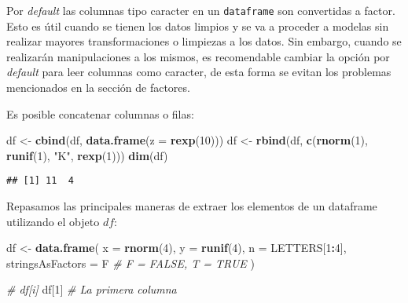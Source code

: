 \documentclass[]{article}
\newenvironment{Shaded}{\begin{snugshade}}{\end{snugshade}}
\newcommand{\KeywordTok}[1]{\textcolor[rgb]{0.13,0.29,0.53}{\textbf{#1}}}
\newcommand{\DataTypeTok}[1]{\textcolor[rgb]{0.13,0.29,0.53}{#1}}
\newcommand{\DecValTok}[1]{\textcolor[rgb]{0.00,0.00,0.81}{#1}}
\newcommand{\StringTok}[1]{\textcolor[rgb]{0.31,0.60,0.02}{#1}}
\newcommand{\CommentTok}[1]{\textcolor[rgb]{0.56,0.35,0.01}{\textit{#1}}}
\newcommand{\OperatorTok}[1]{\textcolor[rgb]{0.81,0.36,0.00}{\textbf{#1}}}
\newcommand{\NormalTok}[1]{#1}
\begin{document}
\begin{curiosidad}[¿Por qué usar la opción \texttt{stringsAsFactors = F}?]

Por \textit{default} las columnas tipo caracter en un \texttt{dataframe} son
convertidas a factor. Esto es útil cuando se tienen los datos limpios y se va 
a proceder a modelas sin realizar mayores transformaciones o limpiezas a los
datos. Sin embargo, cuando se realizarán manipulaciones a los mismos, es 
recomendable cambiar la opción por \textit{default} para leer columnas
como caracter, de esta forma se evitan los problemas mencionados en la sección
de factores.
\end{curiosidad}

Es posible concatenar columnas o filas:

\begin{Shaded}
\begin{Highlighting}[]
\NormalTok{df <-}\StringTok{ }\KeywordTok{cbind}\NormalTok{(df, }\KeywordTok{data.frame}\NormalTok{(}\DataTypeTok{z =} \KeywordTok{rexp}\NormalTok{(}\DecValTok{10}\NormalTok{)))}
\NormalTok{df <-}\StringTok{ }\KeywordTok{rbind}\NormalTok{(df, }\KeywordTok{c}\NormalTok{(}\KeywordTok{rnorm}\NormalTok{(}\DecValTok{1}\NormalTok{), }\KeywordTok{runif}\NormalTok{(}\DecValTok{1}\NormalTok{), }\StringTok{"K"}\NormalTok{, }\KeywordTok{rexp}\NormalTok{(}\DecValTok{1}\NormalTok{)))}
\KeywordTok{dim}\NormalTok{(df)}
\end{Highlighting}
\end{Shaded}

\begin{verbatim}
## [1] 11  4
\end{verbatim}

Repasamos las principales maneras de extraer los elementos de un
dataframe utilizando el objeto \(df\):

\begin{Shaded}
\begin{Highlighting}[]
\NormalTok{df <-}\StringTok{ }\KeywordTok{data.frame}\NormalTok{(}
  \DataTypeTok{x =} \KeywordTok{rnorm}\NormalTok{(}\DecValTok{4}\NormalTok{),}
  \DataTypeTok{y =} \KeywordTok{runif}\NormalTok{(}\DecValTok{4}\NormalTok{),}
  \DataTypeTok{n =}\NormalTok{ LETTERS[}\DecValTok{1}\OperatorTok{:}\DecValTok{4}\NormalTok{],}
  \DataTypeTok{stringsAsFactors =}\NormalTok{ F }\CommentTok{# F = FALSE, T = TRUE}
\NormalTok{)}

\CommentTok{# df[i]}
\NormalTok{df[}\DecValTok{1}\NormalTok{] }\CommentTok{# La primera columna}
\end{Highlighting}
\end{Shaded}
\end{document}
